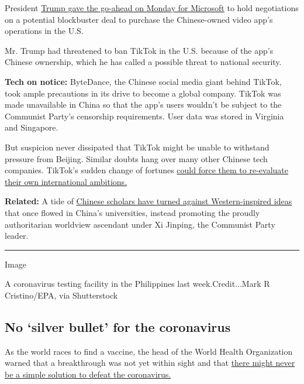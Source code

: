 President
\href{https://www.nytimes.com/2020/08/03/technology/trump-tiktok-microsoft.html?action=click\&module=Top\%20Stories\&pgtype=Homepage}{Trump
gave the go-ahead on Monday for Microsoft} to hold negotiations on a
potential blockbuster deal to purchase the Chinese-owned video app's
operations in the U.S.

Mr. Trump had threatened to ban TikTok in the U.S. because of the app's
Chinese ownership, which he has called a possible threat to national
security.

\textbf{Tech on notice:} ByteDance, the Chinese social media giant
behind TikTok, took ample precautions in its drive to become a global
company. TikTok was made unavailable in China so that the app's users
wouldn't be subject to the Communist Party's censorship requirements.
User data was stored in Virginia and Singapore.

But suspicion never dissipated that TikTok might be unable to withstand
pressure from Beijing. Similar doubts hang over many other Chinese tech
companies. TikTok's sudden change of fortunes
\href{https://www.nytimes.com/2020/08/03/technology/tiktok-bytedance-us-china.html}{could
force them to re-evaluate their own international ambitions.}

\textbf{Related:} A tide of
\href{https://www.nytimes.com/2020/08/02/world/asia/china-hong-kong-national-security-law.html}{Chinese
scholars have turned against Western-inspired ideas} that once flowed in
China's universities, instead promoting the proudly authoritarian
worldview ascendant under Xi Jinping, the Communist Party leader.

\begin{center}\rule{0.5\linewidth}{\linethickness}\end{center}

Image

A coronavirus testing facility in the Philippines last
week.Credit...Mark R Cristino/EPA, via Shutterstock

\hypertarget{no-silver-bullet-for-the-coronavirus}{%
\subsection{No `silver bullet' for the
coronavirus}\label{no-silver-bullet-for-the-coronavirus}}

As the world races to find a vaccine, the head of the World Health
Organization warned that a breakthrough was not yet within sight and
that
\href{https://www.nytimes.com/2020/08/03/world/coronavirus-covid-19.html?action=click\&pgtype=Article\&state=default\&module=styln-coronavirus\&region=TOP_BANNER\&context=storylines_menu}{there
might never be a simple solution to defeat the coronavirus.}

